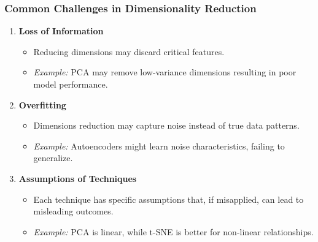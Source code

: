 \documentclass[aspectratio=169]{beamer}
\begin{document}
\begin{frame}[fragile]
    \frametitle{Common Challenges in Dimensionality Reduction}
    \begin{enumerate}
        \item \textbf{Loss of Information}
            \begin{itemize}
                \item Reducing dimensions may discard critical features.
                \item \textit{Example:} PCA may remove low-variance dimensions resulting in poor model performance.
            \end{itemize}
        \item \textbf{Overfitting}
            \begin{itemize}
                \item Dimensions reduction may capture noise instead of true data patterns.
                \item \textit{Example:} Autoencoders might learn noise characteristics, failing to generalize.
            \end{itemize}
        \item \textbf{Assumptions of Techniques}
            \begin{itemize}
                \item Each technique has specific assumptions that, if misapplied, can lead to misleading outcomes.
                \item \textit{Example:} PCA is linear, while t-SNE is better for non-linear relationships.
            \end{itemize}
    \end{enumerate}
\end{frame}
\end{document}
